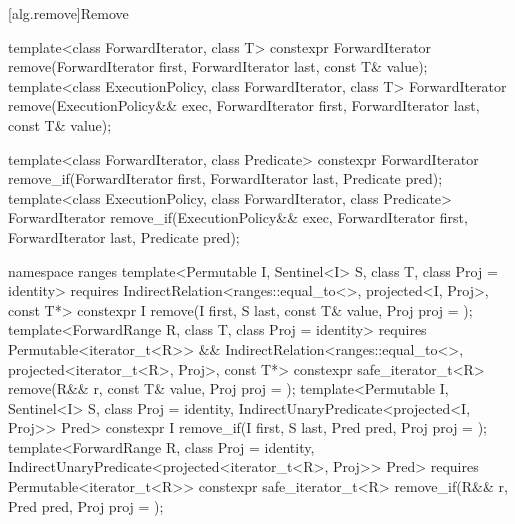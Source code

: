 [alg.remove]{Remove}

%
%
\begin{itemdecl}
template<class ForwardIterator, class T>
  constexpr ForwardIterator remove(ForwardIterator first, ForwardIterator last,
                                   const T& value);
template<class ExecutionPolicy, class ForwardIterator, class T>
  ForwardIterator remove(ExecutionPolicy&& exec,
                         ForwardIterator first, ForwardIterator last,
                         const T& value);

template<class ForwardIterator, class Predicate>
  constexpr ForwardIterator remove_if(ForwardIterator first, ForwardIterator last,
                                      Predicate pred);
template<class ExecutionPolicy, class ForwardIterator, class Predicate>
  ForwardIterator remove_if(ExecutionPolicy&& exec,
                            ForwardIterator first, ForwardIterator last,
                            Predicate pred);

namespace ranges {
  template<Permutable I, Sentinel<I> S, class T, class Proj = identity>
    requires IndirectRelation<ranges::equal_to<>, projected<I, Proj>, const T*>
    constexpr I remove(I first, S last, const T& value, Proj proj = {});
  template<ForwardRange R, class T, class Proj = identity>
    requires Permutable<iterator_t<R>> &&
             IndirectRelation<ranges::equal_to<>, projected<iterator_t<R>, Proj>, const T*>
    constexpr safe_iterator_t<R>
      remove(R&& r, const T& value, Proj proj = {});
  template<Permutable I, Sentinel<I> S, class Proj = identity,
           IndirectUnaryPredicate<projected<I, Proj>> Pred>
    constexpr I remove_if(I first, S last, Pred pred, Proj proj = {});
  template<ForwardRange R, class Proj = identity,
           IndirectUnaryPredicate<projected<iterator_t<R>, Proj>> Pred>
    requires Permutable<iterator_t<R>>
    constexpr safe_iterator_t<R>
      remove_if(R&& r, Pred pred, Proj proj = {});
}
\end{itemdecl}

